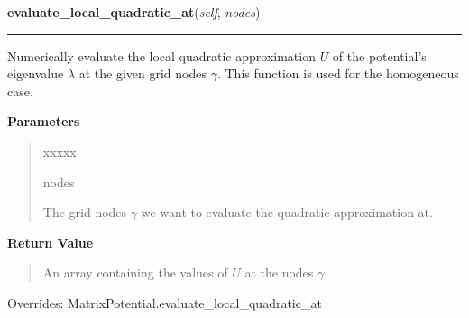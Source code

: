 \hspace{.8\funcindent}\begin{boxedminipage}{\funcwidth}

    \raggedright \textbf{evaluate\_local\_quadratic\_at}(\textit{self}, \textit{nodes})

    \vspace{-1.5ex}

    \rule{\textwidth}{0.5\fboxrule}
\setlength{\parskip}{2ex}
    Numerically evaluate the local quadratic approximation $U$ of the
    potential's eigenvalue $\lambda$ at the given grid
    nodes $\gamma$. This function is used for the
    homogeneous case.

\setlength{\parskip}{1ex}
      \textbf{Parameters}
      \vspace{-1ex}

      \begin{quote}
        \begin{Ventry}{xxxxx}

          \item[nodes]

          The grid nodes $\gamma$ we want to evaluate the
          quadratic approximation at.

        \end{Ventry}

      \end{quote}

      \textbf{Return Value}
    \vspace{-1ex}

      \begin{quote}
      An array containing the values of $U$ at the nodes
      $\gamma$.

      \end{quote}

      Overrides: MatrixPotential.evaluate\_local\_quadratic\_at

    \end{boxedminipage}

    \vspace{0.5ex}

